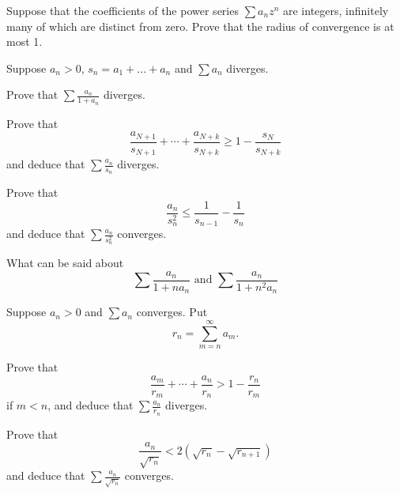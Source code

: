 \begin{myExercise}
    \label{ex:3.10}
    Suppose that the coefficients of the power series $\sum a_n z^n$ are integers, 
    infinitely many of which are distinct from zero. 
    Prove that the radius of convergence is at most 1.
\end{myExercise}

\begin{myExercise}
    \label{ex:3.11}
    Suppose $a_n > 0$, $s_n = a_1 + ... + a_n$ and $\sum a_n$ diverges.
    \begin{asparaenum}[(a)]
        \item Prove that $\sum \frac{a_n}{1+a_n}$ diverges.
        \item Prove that 
        \begin{equation*}
            \frac{a_{N+1}}{s_{N+1}} + \cdots +
            \frac{a_{N+k}}{s_{N+k}} \geq 
            1- \frac{s_N}{s_{N+k}}
        \end{equation*}
        and deduce that $\sum \frac{a_n}{s_n}$ diverges.
        \item Prove that 
        \begin{equation*}
            \frac{a_n}{s_n^2} \leq \frac{1}{s_{n-1}} - \frac{1}{s_n}
        \end{equation*}
        and deduce that $\sum \frac{a_n}{s_n^2}$ converges.
        \item What can be said about 
        \begin{equation*}
            \sum \frac{a_n}{1+n a_n} 
            \text{ and }
            \sum \frac{a_n}{1+n^2a_n}
        \end{equation*}
    \end{asparaenum}
\end{myExercise}

\begin{myExercise}
    \label{ex:3.12}
    Suppose $a_n > 0$ and $\sum a_n$ converges. Put
    \begin{equation*}
        r_n = \sum_{m=n}^{\infty} a_m .
    \end{equation*}
    \begin{asparaenum}[(a)]
        \item Prove that 
        \begin{equation*}
            \frac{a_m}{r_m} + \cdots +
            \frac{a_n}{r_n} > 
            1 - \frac{r_n}{r_m}
        \end{equation*}
        if $m<n$, and deduce that $\sum \frac{a_n}{r_n}$ diverges.
        \item Prove that 
        \begin{equation*}
            \frac{a_n}{\sqrt{r_n}} < 
            2\left( \sqrt{r_n} - \sqrt{r_{n+1}} \right)
        \end{equation*}
        and deduce that $\sum \frac{a_n}{\sqrt{r_n}}$ converges.
    \end{asparaenum}
\end{myExercise}


